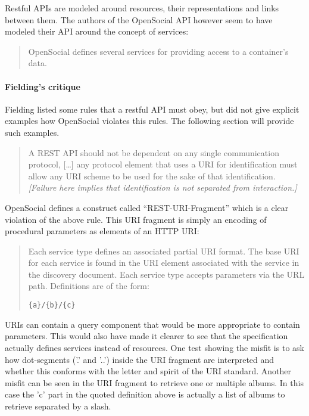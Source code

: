 \documentclass[12pt,a4paper]{scrartcl}		%
\begin{document}
Restful APIs are modeled around resources, their representations and links
between them. The authors of the OpenSocial API however seem to have modeled
their API around the concept of services:\cite[Social API Server, sec 2, Services]{OSSpec2.0.1}
\begin{quote}
  OpenSocial defines several services for providing access to a container's data.
\end{quote}

\paragraph{Fielding's critique}
Fielding listed some rules that a restful API must obey, but did not give
explicit examples how OpenSocial violates this rules. The following section will
provide such examples.

\begin{quote}
  A REST API should not be dependent on any single communication protocol,
  [\ldots] any protocol element that uses a URI for identification must allow
  any URI scheme to be used for the sake of that identification.
  \textit{[Failure here implies that identification is not separated from
    interaction.]}
\end{quote}

OpenSocial defines a construct called ``REST-URI-Fragment'' which is a clear
violation of the above rule. This URI fragment is simply an encoding of
procedural parameters as elements of an HTTP URI:\cite[Core API Server, sec
2.1.1.2.2, REST-URI-Fragment]{OSSpec2.0.1}

\begin{quote}
  Each service type defines an associated partial URI format. The base URI for
  each service is found in the URI element associated with the service in the
  discovery document. Each service type accepts parameters via the URL
  path. Definitions are of the form:
  
  \verb:{a}/{b}/{c}:
\end{quote}

URIs can contain a query component that would be more appropriate to contain
parameters. This would also have made it clearer to see that the specification
actually defines services instead of resources. One test showing the misfit is
to ask how dot-segments ('.' and '..') inside the URI fragment are interpreted
and whether this conforms with the letter and spirit of the URI
standard\cite[sec 3.3]{RFC3986}. Another misfit can be seen in the URI fragment
to retrieve one or multiple albums. In this case the 'c' part in the quoted
definition above is actually a list of albums to retrieve separated by a slash.
\end{document}
